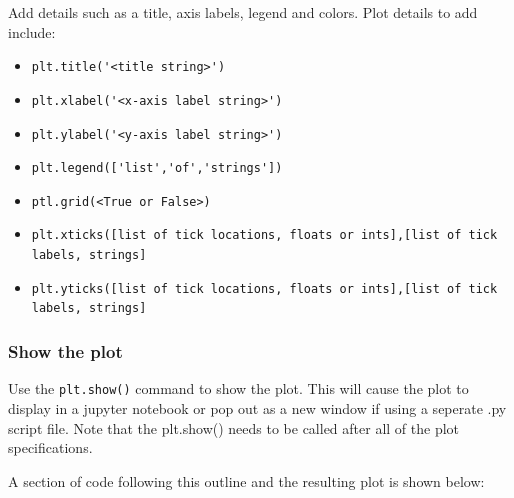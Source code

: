\documentclass{book}
\providecommand{\tightlist}{%
      \setlength{\itemsep}{0pt}\setlength{\parskip}{0pt}}
\begin{document}
Add details such as a title, axis labels, legend and colors. Plot
details to add include:

\begin{itemize}
\tightlist
\item
  \lstinline!plt.title('<title string>')!
\item
  \lstinline!plt.xlabel('<x-axis label string>')!
\item
  \lstinline!plt.ylabel('<y-axis label string>')!
\item
  \lstinline!plt.legend(['list','of','strings'])!
\item
  \lstinline!ptl.grid(<True or False>)!
\item
  \lstinline!plt.xticks([list of tick locations, floats or ints],[list of tick labels, strings]!
\item
  \lstinline!plt.yticks([list of tick locations, floats or ints],[list of tick labels, strings]!
\end{itemize}

\subsubsection{Show the plot}\label{show-the-plot}

Use the \lstinline!plt.show()! command to show the plot. This will cause
the plot to display in a jupyter notebook or pop out as a new window if
using a seperate .py script file. Note that the plt.show() needs to be
called after all of the plot specifications.

    A section of code following this outline and the resulting plot is shown
below:
\end{document}
